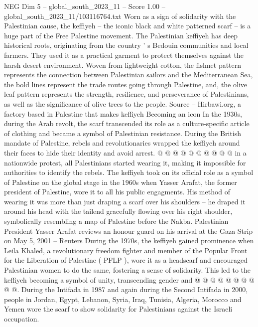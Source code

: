 \begin{textsample}{NEG Dim 5 – global\_south\_2023\_11 – Score 1.00 – global\_south\_2023\_11/103116764.txt}  \label{ex:f5_neg_208}
Worn as a sign of solidarity with the Palestinian cause, the keffiyeh -- the iconic black and white patterned scarf -- is a huge part of the Free Palestine movement.
The Palestinian keffiyeh has deep historical roots, originating from the country ' s Bedouin communities and local farmers.
They used it as a practical garment to protect themselves against the harsh desert environment.
Woven from lightweight cotton, the fishnet pattern represents the connection between Palestinian sailors and the Mediterranean Sea, the bold lines represent the trade routes going through Palestine, and, the olive leaf pattern represents the strength, resilience, and perseverance of Palestinians, as well as the significance of olive trees to the people.
Source -- Hirbawi.org, a factory based in Palestine that makes keffiyeh Becoming an icon In the 1930s, during the Arab revolt, the scarf transcended its role as a culture-specific article of clothing and became a symbol of Palestinian resistance.
During the British mandate of Palestine, rebels and revolutionaries wrapped the keffiyeh around their faces to hide their identity and avoid arrest. @ @ @ @ @ @ @ @ @ @ in a nationwide protest, all Palestinians started wearing it, making it impossible for authorities to identify the rebels.
The keffiyeh took on its official role as a symbol of Palestine on the global stage in the 1960s when Yasser Arafat, the former president of Palestine, wore it to all his public engagments.
His method of wearing it was more than just draping a scarf over his shoulders -- he draped it around his head with the tailend gracefully flowing over his right shoulder, symbolically resembling a map of Palestine before the Nakba.
Palestinian President Yasser Arafat reviews an honour guard on his arrival at the Gaza Strip on May 5, 2001 -- Reuters During the 1970s, the keffiyeh gained prominence when Leila Khaled, a revolutionary freedom fighter and member of the Popular Front for the Liberation of Palestine ( PFLP ), wore it as a headscarf and encouraged Palestinian women to do the same, fostering a sense of solidarity.
This led to the keffiyeh becoming a symbol of unity, transcending gender and @ @ @ @ @ @ @ @ @ @.
During the Intifada in 1987 and again during the Second Intifada in 2000, people in Jordan, Egypt, Lebanon, Syria, Iraq, Tunisia, Algeria, Morocco and Yemen wore the scarf to show solidarity for Palestinians against the Israeli occupation.

\end{textsample}
